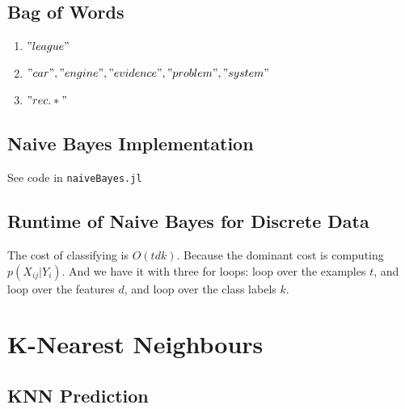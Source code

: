 \documentclass{article}
\begin{document}
\subsection{Bag of Words}

\begin{enumerate}
\item  $"league"$
\item  $"car", "engine", "evidence", "problem", "system"$
\item $"rec.*"$

\end{enumerate}


\subsection{Naive Bayes Implementation}

See code in \texttt{naiveBayes.jl}

\subsection{Runtime of Naive Bayes for Discrete Data}

The cost of classifying is $O(tdk)$. Because the dominant cost is computing $p(X_{ij} | Y_{i})$. And we have it with three for loops: loop over the examples $t$, and loop over the features $d$, and loop over the class labels $k$.


\section{K-Nearest Neighbours}

\subsection{KNN Prediction}
\end{document}
